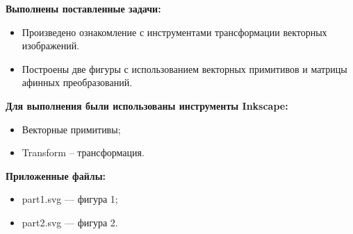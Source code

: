 
\textbf{Выполнены поставленные задачи:}
\begin{itemize}
    \item Произведено ознакомление с инструментами трансформации векторных изображений.
    \item Построены две фигуры с использованием векторных примитивов и
        матрицы афинных преобразований.
\end{itemize}
\hspace{0pt}

\textbf{Для выполнения были использованы инструменты Inkscape:}
\begin{itemize}
    \item Векторные примитивы;
    \item Transform -- трансформация.
\end{itemize}
\hspace{0pt}

\textbf{Приложенные файлы:}
\begin{itemize}
    \item part1.svg --- фигура 1;
    \item part2.svg --- фигура 2.
\end{itemize}


